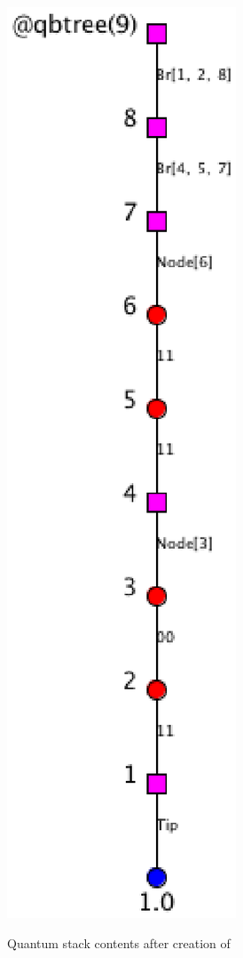 \begin{figure}[htbp]
\begin{center}
{\includegraphics[scale=.5]{images/treeExampleInQSTrimmed.eps}}
\end{center}
\caption{Quantum stack contents after creation of }\label{fig:treeExampleInQS}
\end{figure}
